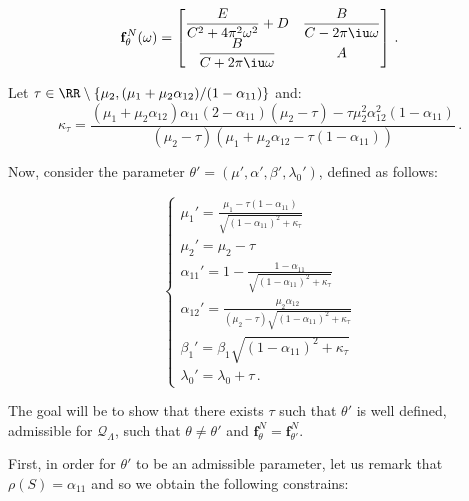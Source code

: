 \begin{subappendices}
\begin{itemize}
\begin{equation}\label{eq:chap3_bi_matrix_constants}
\mathbf{f}_\theta^N(\omega) = 
\begin{bmatrix}
  \dfrac{E}{C^2 + 4 \pi^2 \omega^2} + D & \dfrac{B}{C - 2 \pi \iu \omega}\\
  \dfrac{B}{C + 2 \pi \iu \omega} & A
\end{bmatrix}\,.
\end{equation}

Let $\tau\in\RR\setminus \left\{\mu_2, (\mu_1 + \mu_2 \alpha_{12})/(1-\alpha_{11}) \right\}$ and: \[\kappa_\tau = \frac{(\mu_1 + \mu_2 \alpha_{12})\alpha_{11}(2-\alpha_{11})(\mu_2 - \tau) - \tau\mu_2^2 \alpha_{12}^2(1-\alpha_{11})}{(\mu_2 - \tau)(\mu_1 + \mu_2\alpha_{12} - \tau(1-\alpha_{11}))}\,.\]

Now, consider the parameter $\theta' = (\mu', \alpha', \beta', \lambda_0')$, defined as follows:

\begin{equation}\label{eq:chap3_bi_system_constants}
\begin{cases}
  \mu_1' = \frac{\mu_1 - \tau(1-\alpha_{11})}{\sqrt{(1-\alpha_{11})^2 + \kappa_\tau}}\\
  \mu_2' = \mu_2 - \tau\\
  \alpha_{11}' = 1 - \frac{1-\alpha_{11}}{\sqrt{(1-\alpha_{11})^2 + \kappa_\tau}}\\
  \alpha_{12}' = \frac{\mu_2 \alpha_{12}}{(\mu_2 - \tau)\sqrt{(1-\alpha_{11})^2 + \kappa_\tau}}\\
  \beta_1' = \beta_1 \sqrt{(1-\alpha_{11})^2 + \kappa_\tau}\\
  \lambda_0' = \lambda_0 + \tau\,.
\end{cases}
\end{equation}

The goal will be to show that there exists $\tau$ such that $\theta'$ is well defined, admissible for $\mathcal Q_\Lambda$, such that $\theta\neq\theta'$ and $\mathbf{f}_\theta^N = \mathbf{f}_{\theta'}^N$.

First, in order for $\theta'$ to be an admissible parameter, let us remark that $\rho(S) = \alpha_{11}$ and so we obtain the following constrains:


\end{itemize}
\end{subappendices}
